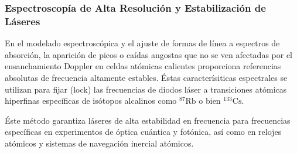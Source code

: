 \subsubsection*{Espectroscopía de Alta Resolución y Estabilización de Láseres}
En el modelado espectroscópica y el ajuste de formas de línea a espectros de absorción, la aparición de picos o caídas angostas que no se ven afectadas por el ensanchamiento Doppler en celdas atómicas calientes proporciona referencias absolutas de frecuencia altamente estables. Éstas caracterísiticas espectrales se utilizan para fijar (lock) las frecuencias de diodos láser a transiciones atómicas hiperfinas específicas de isótopos alcalinos como $^{87}\text{Rb}$ o bien $^{133}\text{Cs}$. 

Éste método garantiza láseres de alta estabilidad en frecuencia para frecuencias específicas en experimentos de óptica cuántica y fotónica, así como en relojes atómicos y sistemas de navegación inercial atómicos.